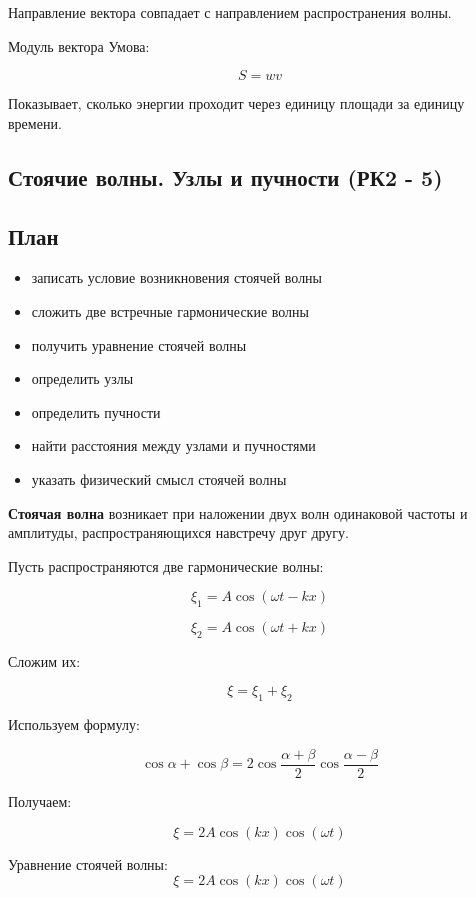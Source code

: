 \documentclass[a4paper,12pt]{article}
\begin{document}
Направление вектора совпадает с направлением распространения волны.

Модуль вектора Умова:

\[
S = w v
\]

Показывает, сколько энергии проходит через единицу площади за единицу времени.

\subsection{Стоячие волны. Узлы и пучности (РК2 - 5)}

\subsection*{План}
\begin{itemize}
\item записать условие возникновения стоячей волны
\item сложить две встречные гармонические волны
\item получить уравнение стоячей волны
\item определить узлы
\item определить пучности
\item найти расстояния между узлами и пучностями
\item указать физический смысл стоячей волны
\end{itemize}

\begin{definitionbox}
\textbf{Стоячая волна} возникает при наложении двух волн одинаковой частоты и амплитуды, распространяющихся навстречу друг другу.
\end{definitionbox}

Пусть распространяются две гармонические волны:

\[
\xi_1 = A \cos(\omega t - kx)
\]

\[
\xi_2 = A \cos(\omega t + kx)
\]

Сложим их:

\[
\xi = \xi_1 + \xi_2
\]

Используем формулу:

\[
\cos \alpha + \cos \beta =
2 \cos\frac{\alpha + \beta}{2}
\cos\frac{\alpha - \beta}{2}
\]

Получаем:

\[
\xi = 2A \cos(kx)\cos(\omega t)
\]

\begin{theorembox}
Уравнение стоячей волны:
\[
\xi = 2A \cos(kx)\cos(\omega t)
\]
\end{theorembox}
\end{document}
